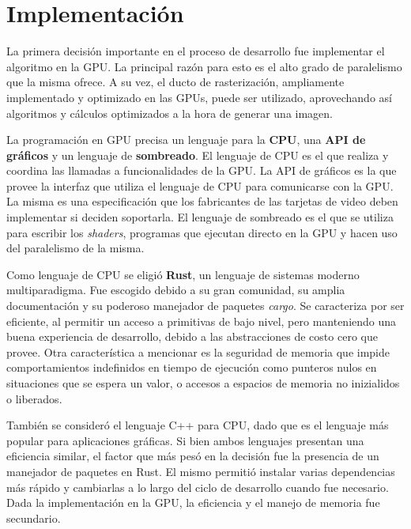 \graphicspath{{chapters/4_implementación/figures}}

\chapter{Implementación}\label{chap:implementation}

La primera decisión importante en el proceso de desarrollo fue implementar el algoritmo en la GPU.
La principal razón para esto es el alto grado de paralelismo que la misma ofrece.
A su vez, el ducto de rasterización, ampliamente implementado y optimizado en las GPUs, puede ser utilizado, aprovechando así algoritmos y cálculos optimizados a la hora de generar una imagen.

La programación en GPU precisa un lenguaje para la \textbf{CPU}, una \textbf{API de gráficos} y un lenguaje de \textbf{sombreado}.
El lenguaje de CPU es el que realiza y coordina las llamadas a funcionalidades de la GPU.
La API de gráficos es la que provee la interfaz que utiliza el lenguaje de CPU para comunicarse con la GPU.
La misma es una especificación que los fabricantes de las tarjetas de video deben implementar si deciden soportarla.
El lenguaje de sombreado es el que se utiliza para escribir los \textit{shaders}, programas que ejecutan directo en la GPU y hacen uso del paralelismo de la misma.

Como lenguaje de CPU se eligió \textbf{Rust}, un lenguaje de sistemas moderno multiparadigma.
Fue escogido debido a su gran comunidad, su amplia documentación y su poderoso manejador de paquetes \textit{cargo}.  
Se caracteriza por ser eficiente, al permitir un acceso a primitivas de bajo nivel, pero manteniendo una buena experiencia de desarrollo, debido a las abstracciones de costo cero que provee.
Otra característica a mencionar es la seguridad de memoria que impide comportamientos indefinidos en tiempo de ejecución como punteros nulos en situaciones que se espera un valor, o accesos a espacios de memoria no inizialidos o liberados.

También se consideró el lenguaje C++ para CPU, dado que es el lenguaje más popular para aplicaciones gráficas.  
Si bien ambos lenguajes presentan una eficiencia similar, el factor que más pesó en la decisión fue la presencia de un manejador de paquetes en Rust.
El mismo permitió instalar varias dependencias más rápido y cambiarlas a lo largo del ciclo de desarrollo cuando fue necesario.
Dada la implementación en la GPU, la eficiencia y el manejo de memoria fue secundario. 

